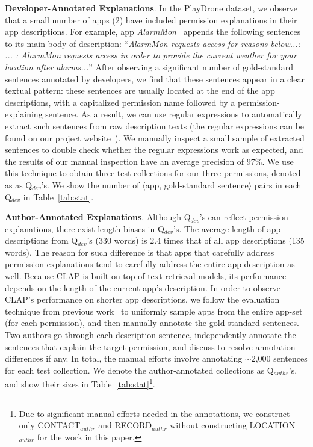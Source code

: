\textbf{Developer-Annotated Explanations}. In the PlayDrone dataset, we observe that a small number of apps (2\textperthousand) have included permission explanations in their app descriptions. 
For example, app \emph{AlarmMon}~\cite{alarmmon} appends the following sentences to its main body of description: ``\emph{AlarmMon requests access for reasons below...: ... : AlarmMon requests access in order to provide the current weather for your location after alarms...}''
After observing a significant number of gold-standard sentences annotated by developers, we find that these sentences appear in a clear textual pattern: these sentences are usually located at the end of the app descriptions, with a capitalized permission name followed by a permission-explaining sentence. 
As a result, we can use regular expressions to automatically extract such sentences from raw description texts (the regular expressions can be found on our project website~\cite{clapproj}). 
We manually inspect a small sample of extracted sentences to double check whether the regular expressions work as expected, and the results of our manual inspection have an average precision of 97\%. 
We use this technique to obtain three test collections for our three permissions, denoted as as Q$_{dev}$'s. 
We show the number of $\langle$app, gold-standard sentence$\rangle$ pairs in each Q$_{dev}$ in Table~\ref{tab:stat}.  

\textbf{Author-Annotated Explanations}. 
Although Q$_{dev}$'s can reflect permission explanations, there exist length biases in Q$_{dev}$'s. 
The average length of app descriptions from Q$_{dev}$'s (330 words) is 2.4 times that of all app descriptions (135 words). 
The reason for such difference is that apps that carefully address permission explanations tend to carefully address the entire app description as well. 
Because CLAP is built on top of text retrieval models, its performance depends on the length of the current app's description. 
In order to observe CLAP's performance on shorter app descriptions, we follow the evaluation technique from previous work~\cite{conf/uss/PanditaXYEX13} to uniformly sample apps from the entire app-set (for each permission), and then manually annotate the gold-standard sentences.
Two authors go through each description sentence, independently annotate the sentences that explain the target permission, and discuss to resolve annotation differences if any. In total, the manual efforts involve annotating $\sim$2,000 sentences for each test collection. We denote the author-annotated collections as Q$_{authr}$'s, and show their sizes in Table~\ref{tab:stat}\footnote{Due to significant manual efforts needed in the annotations, we construct only \textsf{CONTACT}$_{authr}$ and \textsf{RECORD}$_{authr}$ without constructing \textsf{LOCATION}$_{authr}$ for the work in this paper.}.  

